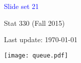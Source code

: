 \documentclass[20pt,landscape]{foils}
\newcommand{\no}{\noindent}
\newcommand{\bul}{\hspace*{.1in}{\textcolor{red}{$\bullet$ \ }}}
\begin{document}
\LogoOff

\foilhead[1.3in]{}
\centerline{\LARGE \textcolor{blue}{Slide set 21}}
\vspace{0.3in}
\centerline{\large Stat 330 (Fall 2015)}
\vspace{0.2in}
\centerline{\tiny Last update: \today}
\setcounter{page}{0}


\foilhead[-.8in]{\textcolor{blue}{Queuing systems}}\vspace*{.35in}
 \centerline{\texttt{[image: queue.pdf]}}
\end{document}

